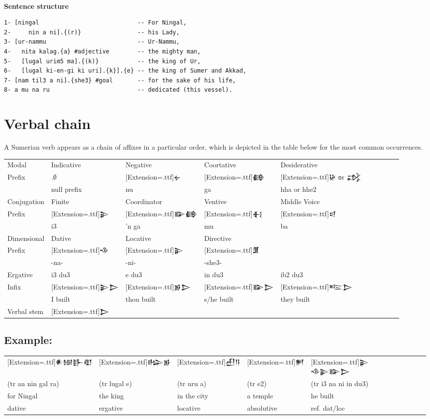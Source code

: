 \documentclass[a4paper,12pt]{book}
\newcommand{\fcm}{\large\setmainfont{Akkadian}[Extension=.ttf]}
\newcommand{\fsm}{\Large\setmainfont{Akkadian}[Extension=.ttf]}
\begin{document}
\verb||\\
{\large\bf Sentence structure}
\begin{verbatim}
1- [ningal                            -- For Ningal,
2-     nin a ni].{(r)}                -- his Lady,
3- [ur-nammu                          -- Ur-Nammu,
4-   nita kalag.{a} #adjective        -- the mighty man,
5-   [lugal urim5 ma].{(k)}           -- the king of Ur,
6-   [lugal ki-en-gi ki uri].{k}].{e} -- the king of Sumer and Akkad,
7- [nam til3 a ni].{she3} #goal       -- for the sake of his life,
8- a mu na ru                         -- dedicated (this vessel).
\end{verbatim}

\newpage
\section{Verbal chain}
A Sumerian verb appears
as a chain of affixes in a particular order,
which is depicted in the table below for
the most common occurrences.\\

\noindent
\begin{tabular}[!h]{|l | l | l | l | l | l l l l l}
  \hline
  Modal  & Indicative & Negative
  & Coortative & Desiderative\\
  Prefix&$.\emptyset$ &\fsm 𒉡 &\fsm 𒂵 &\fsm 𒄩
       {\texttt or} 𒃶\\
  & null prefix & nu & ga & hha or hhe2\\
  \hline
  Conjugation  & Finite & Coordinator & Ventive & Middle Voice\\
  Prefix&\fsm 𒉌 &\fsm 𒅔𒂵 &\fsm 𒈬 &\fsm 𒁀\\
  & i3 & 'n ga & mu & ba\\
  \hline
  Dimensional & Dative &Locative &Directive &\\
  Prefix &\fsm 𒈾&\fsm 𒉌 &\fsm 𒂠 & \\
  & -na- & -ni- & -she3- &\\
  \hline
  Ergative & i3 du3 & e du3 & in du3 & ib2 du3 \\
  Infix   &\fsm 𒉌𒆕&\fsm 𒂊𒆕 &\fsm 𒅔𒆕 &\fsm 𒌈𒆕\\
  &I built & thou built & s/he built & they built\\
  \hline
  Verbal stem &\multicolumn{4}{l|}{\fsm 𒆕}\\
  \hline
\end{tabular}

\subsection*{Example:}
\begin{tabular}[!h]{l | l| l| l | l l l l l l}
  \fcm 𒀭𒎏𒃲𒊏 &\fcm 𒈗𒂊 &\fcm 𒌷𒀀 &\fcm 𒂍
  &\fcm 𒉌 𒈾𒉌𒅔𒆕\\
  (tr an nin gal ra) & (tr lugal e) & (tr uru a) &
  (tr e2) & (tr i3 na ni in du3)\\
  for Ningal & the king & in the city & a temple & he built\\
  dative & ergative & locative & absolutive & ref. dat/loc\\
\end{tabular}
\end{document}
